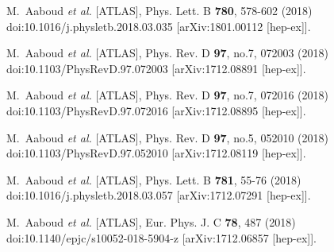 \begin{thebibliography}{9}
M.~Aaboud \textit{et al.} [ATLAS],
Phys. Lett. B \textbf{780}, 578-602 (2018)
doi:10.1016/j.physletb.2018.03.035
[arXiv:1801.00112 [hep-ex]].

M.~Aaboud \textit{et al.} [ATLAS],
Phys. Rev. D \textbf{97}, no.7, 072003 (2018)
doi:10.1103/PhysRevD.97.072003
[arXiv:1712.08891 [hep-ex]].

M.~Aaboud \textit{et al.} [ATLAS],
Phys. Rev. D \textbf{97}, no.7, 072016 (2018)
doi:10.1103/PhysRevD.97.072016
[arXiv:1712.08895 [hep-ex]].

M.~Aaboud \textit{et al.} [ATLAS],
Phys. Rev. D \textbf{97}, no.5, 052010 (2018)
doi:10.1103/PhysRevD.97.052010
[arXiv:1712.08119 [hep-ex]].

M.~Aaboud \textit{et al.} [ATLAS],
Phys. Lett. B \textbf{781}, 55-76 (2018)
doi:10.1016/j.physletb.2018.03.057
[arXiv:1712.07291 [hep-ex]].

M.~Aaboud \textit{et al.} [ATLAS],
Eur. Phys. J. C \textbf{78}, 487 (2018)
doi:10.1140/epjc/s10052-018-5904-z
[arXiv:1712.06857 [hep-ex]].


\end{thebibliography}
